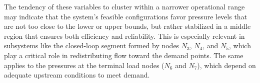 The tendency of these variables to cluster within a narrower operational range may indicate that the system's feasible configurations favor pressure levels that are not too close to the lower or upper bounds, but rather stabilized in a middle region that ensures both efficiency and reliability. This is especially relevant in subsystems like the closed-loop segment formed by nodes $N_3$, $N_4$, and $N_5$, which play a critical role in redistributing flow toward the demand points. The same applies to the pressures at the terminal load nodes ($N_6$ and $N_7$), which depend on adequate upstream conditions to meet demand.








%  
%
%
%  
%
